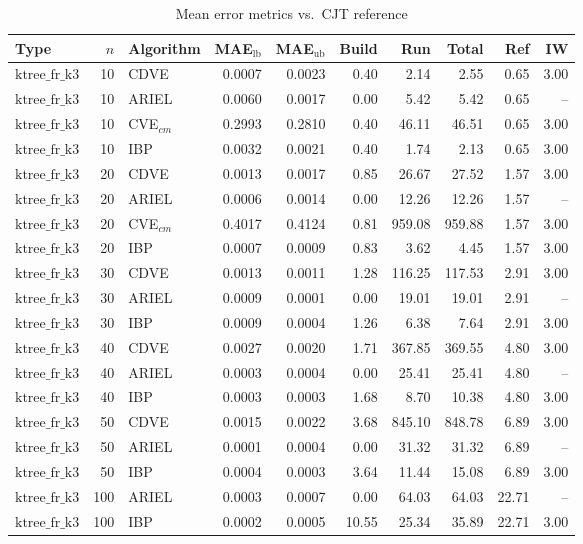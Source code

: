 \begin{table}[ht]
\centering
\scriptsize
\caption{Mean error metrics vs.\ CJT reference}
\begin{tabular}{lrlrrrrrrr}
\toprule
Type & $n$ & Algorithm & MAE$_{\text{lb}}$ & MAE$_{\text{ub}}$ & Build & Run & Total & Ref & IW \\
\midrule
$\text{ktree\_fr\_k3}$ & 10 & CDVE & 0.0007 & 0.0023 & 0.40 & 2.14 & 2.55 & 0.65 & 3.00 \\
$\text{ktree\_fr\_k3}$ & 10 & ARIEL & 0.0060 & 0.0017 & 0.00 & 5.42 & 5.42 & 0.65 & -- \\
$\text{ktree\_fr\_k3}$ & 10 & CVE$_{cm}$ & 0.2993 & 0.2810 & 0.40 & 46.11 & 46.51 & 0.65 & 3.00 \\
$\text{ktree\_fr\_k3}$ & 10 & IBP & 0.0032 & 0.0021 & 0.40 & 1.74 & 2.13 & 0.65 & 3.00 \\
\hline
$\text{ktree\_fr\_k3}$ & 20 & CDVE & 0.0013 & 0.0017 & 0.85 & 26.67 & 27.52 & 1.57 & 3.00 \\
$\text{ktree\_fr\_k3}$ & 20 & ARIEL & 0.0006 & 0.0014 & 0.00 & 12.26 & 12.26 & 1.57 & -- \\
$\text{ktree\_fr\_k3}$ & 20 & CVE$_{cm}$ & 0.4017 & 0.4124 & 0.81 & 959.08 & 959.88 & 1.57 & 3.00 \\
$\text{ktree\_fr\_k3}$ & 20 & IBP & 0.0007 & 0.0009 & 0.83 & 3.62 & 4.45 & 1.57 & 3.00 \\
\hline
$\text{ktree\_fr\_k3}$ & 30 & CDVE & 0.0013 & 0.0011 & 1.28 & 116.25 & 117.53 & 2.91 & 3.00 \\
$\text{ktree\_fr\_k3}$ & 30 & ARIEL & 0.0009 & 0.0001 & 0.00 & 19.01 & 19.01 & 2.91 & -- \\
$\text{ktree\_fr\_k3}$ & 30 & IBP & 0.0009 & 0.0004 & 1.26 & 6.38 & 7.64 & 2.91 & 3.00 \\
\hline
$\text{ktree\_fr\_k3}$ & 40 & CDVE & 0.0027 & 0.0020 & 1.71 & 367.85 & 369.55 & 4.80 & 3.00 \\
$\text{ktree\_fr\_k3}$ & 40 & ARIEL & 0.0003 & 0.0004 & 0.00 & 25.41 & 25.41 & 4.80 & -- \\
$\text{ktree\_fr\_k3}$ & 40 & IBP & 0.0003 & 0.0003 & 1.68 & 8.70 & 10.38 & 4.80 & 3.00 \\
\hline
$\text{ktree\_fr\_k3}$ & 50 & CDVE & 0.0015 & 0.0022 & 3.68 & 845.10 & 848.78 & 6.89 & 3.00 \\
$\text{ktree\_fr\_k3}$ & 50 & ARIEL & 0.0001 & 0.0004 & 0.00 & 31.32 & 31.32 & 6.89 & -- \\
$\text{ktree\_fr\_k3}$ & 50 & IBP & 0.0004 & 0.0003 & 3.64 & 11.44 & 15.08 & 6.89 & 3.00 \\
\hline
$\text{ktree\_fr\_k3}$ & 100 & ARIEL & 0.0003 & 0.0007 & 0.00 & 64.03 & 64.03 & 22.71 & -- \\
$\text{ktree\_fr\_k3}$ & 100 & IBP & 0.0002 & 0.0005 & 10.55 & 25.34 & 35.89 & 22.71 & 3.00 \\
\bottomrule
\end{tabular}
\end{table}

